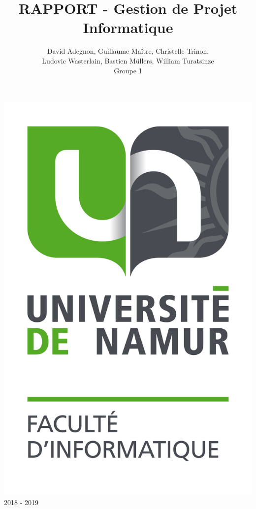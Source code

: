 \documentclass[t, 12pt, usenames,dvipsnames]{article}
\title{RAPPORT - Gestion de Projet Informatique}
\author{David Adegnon, Guillaume Maître, Christelle Trinon,\\Ludovic Wasterlain, Bastien Müllers, William Turatsinze\\Groupe 1}
\begin{document}
    \begin{titlepage}
        \maketitle
        
        \begin{center}
            \includegraphics[scale=0.5]{images/FAC_info.png} \\
            2018 - 2019
        \end{center}
    
    \end{titlepage}

    
\end{document}
